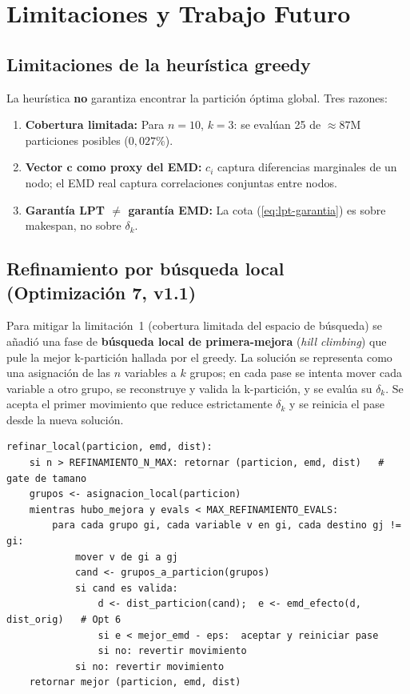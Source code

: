 \documentclass[12pt,letterpaper]{article}
\theoremstyle{definition}
\theoremstyle{remark}
\begin{document}
\section{Limitaciones y Trabajo Futuro}
\label{sec:limitaciones}

\subsection{Limitaciones de la heurística greedy}

La heurística \textbf{no} garantiza encontrar la partición óptima global. Tres razones:
\begin{enumerate}
  \item \textbf{Cobertura limitada:} Para $n=10$, $k=3$: se evalúan 25 de
    $\approx 87$M particiones posibles ($0{,}027\%$).
  \item \textbf{Vector $\mathbf{c}$ como proxy del EMD:} $c_i$ captura diferencias
    marginales de un nodo; el EMD real captura correlaciones conjuntas entre nodos.
  \item \textbf{Garantía LPT $\neq$ garantía EMD:}
    La cota (\ref{eq:lpt-garantia}) es sobre makespan, no sobre $\delta_k$.
\end{enumerate}

\subsection{Refinamiento por búsqueda local (Optimización 7, v1.1)}
\label{sec:busqueda-local}

Para mitigar la limitación~1 (cobertura limitada del espacio de búsqueda) se añadió
una fase de \textbf{búsqueda local de primera-mejora} (\emph{hill climbing}) que pule la
mejor k-partición hallada por el greedy. La solución se representa como una asignación de
las $n$ variables a $k$ grupos; en cada pase se intenta mover cada variable a otro grupo,
se reconstruye y valida la k-partición, y se evalúa su $\delta_k$. Se acepta el primer
movimiento que reduce estrictamente $\delta_k$ y se reinicia el pase desde la nueva solución.

\begin{lstlisting}[style=pseudocode,
  caption={Refinamiento por busqueda local (first-improvement)},label=lst:opt7]
refinar_local(particion, emd, dist):
    si n > REFINAMIENTO_N_MAX: retornar (particion, emd, dist)   # gate de tamano
    grupos <- asignacion_local(particion)
    mientras hubo_mejora y evals < MAX_REFINAMIENTO_EVALS:
        para cada grupo gi, cada variable v en gi, cada destino gj != gi:
            mover v de gi a gj
            cand <- grupos_a_particion(grupos)
            si cand es valida:
                d <- dist_particion(cand);  e <- emd_efecto(d, dist_orig)   # Opt 6
                si e < mejor_emd - eps:  aceptar y reiniciar pase
                si no: revertir movimiento
            si no: revertir movimiento
    retornar mejor (particion, emd, dist)
\end{lstlisting}
\end{document}
